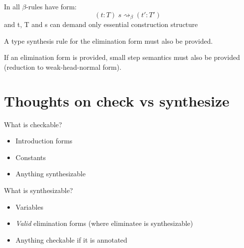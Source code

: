 In \cite{TypesWhoSayNi} all $\beta$-rules have form:
$$(t:T)\;s \rightsquigarrow_{\beta} (t' : T')$$
and t, T and s can demand only essential construction structure

A type synthesis rule for the elimination form must also be provided.

If an elimination form is provided, small step semantics must also be
provided (reduction to weak-head-normal form).

\section{Thoughts on check vs synthesize}

What is checkable?

\begin{itemize}
\item Introduction forms
\item Constants
\item Anything synthesizable
\end{itemize}

What is synthesizable?

\begin{itemize}
\item Variables
\item \emph{Valid} elimination forms (where eliminatee is synthesizable)
\item Anything checkable if it is annotated
\end{itemize}
